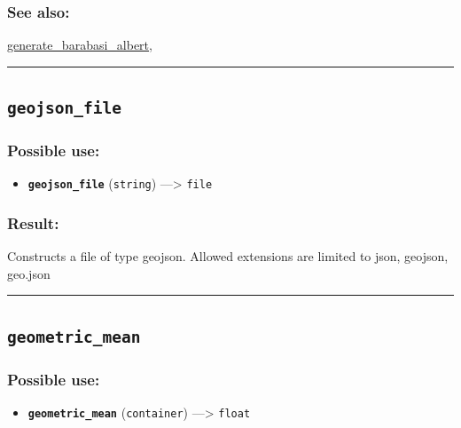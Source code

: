 \documentclass[]{book}
\providecommand{\tightlist}{%
  \setlength{\itemsep}{0pt}\setlength{\parskip}{0pt}}
\theoremstyle{definition}
\theoremstyle{definition}
\theoremstyle{definition}
\theoremstyle{remark}
\begin{document}
\subsubsection{See also:}\label{see-also-105}

\href{operators-d-to-h.html\#generate_barabasi_albert}{generate\_barabasi\_albert},

\begin{center}\rule{0.5\linewidth}{\linethickness}\end{center}

\subsection{\texorpdfstring{\texttt{geojson\_file}}{geojson\_file}}\label{geojson_file}

\subsubsection{Possible use:}\label{possible-use-189}

\begin{itemize}
\tightlist
\item
  \textbf{\texttt{geojson\_file}} (\texttt{string}) ---\textgreater{}
  \texttt{file}
\end{itemize}

\subsubsection{Result:}\label{result-183}

Constructs a file of type geojson. Allowed extensions are limited to
json, geojson, geo.json

\begin{center}\rule{0.5\linewidth}{\linethickness}\end{center}

\subsection{\texorpdfstring{\texttt{geometric\_mean}}{geometric\_mean}}\label{geometric_mean}

\subsubsection{Possible use:}\label{possible-use-190}

\begin{itemize}
\tightlist
\item
  \textbf{\texttt{geometric\_mean}} (\texttt{container})
  ---\textgreater{} \texttt{float}
\end{itemize}
\end{document}
